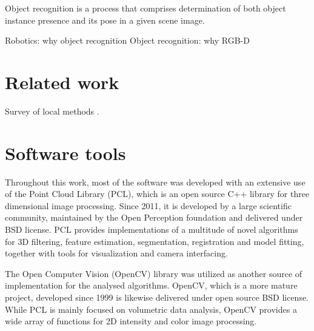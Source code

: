 Object recognition is a process that comprises determination of both object instance presence and its pose in a given scene image.   

Robotics: why object recognition
Object recognition: why RGB-D




\section{Related work}
\label{sec:related}


Survey of local methods \cite{surveyLocal}.


\section{Software tools}
\label{sec:software}

Throughout this work, most of the software was developed with an extensive use of the Point Cloud Library (PCL)\cite{Rusu_ICRA2011_PCL}, which is an open source C++ library for three dimensional image processing. Since 2011, it is developed by a large scientific community, maintained by the Open Perception foundation and delivered under BSD license. PCL provides implementations of a multitude of novel algorithms for 3D filtering, feature estimation, segmentation, registration and model fitting, together with tools for visualization and camera interfacing.

The Open Computer Vision (OpenCV)\cite{OpenCV} library was utilized as another source of implementation for the analysed algorithms. OpenCV, which is a more mature project, developed since 1999 is likewise delivered under open source BSD license. While PCL is mainly focused on volumetric data analysis, OpenCV provides a wide array of functions for 2D intensity and color image processing.








